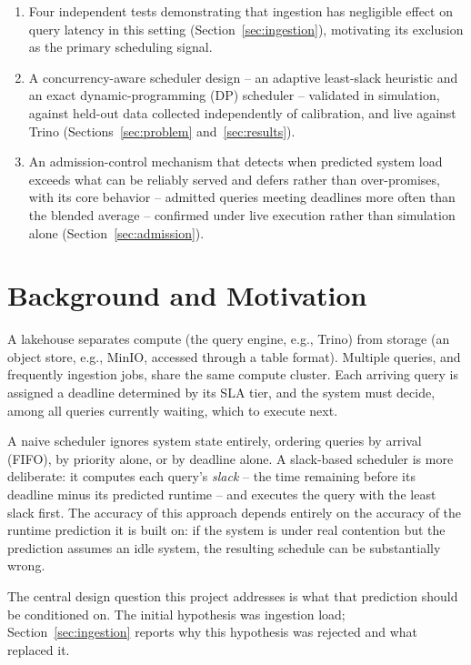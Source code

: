 \documentclass[conference]{IEEEtran}
\begin{document}
\begin{enumerate}
\item Four independent tests demonstrating that ingestion has negligible effect on query latency in this setting (Section~\ref{sec:ingestion}), motivating its exclusion as the primary scheduling signal.
\item A concurrency-aware scheduler design -- an adaptive least-slack heuristic and an exact dynamic-programming (DP) scheduler -- validated in simulation, against held-out data collected independently of calibration, and live against Trino (Sections~\ref{sec:problem} and~\ref{sec:results}).
\item An admission-control mechanism that detects when predicted system load exceeds what can be reliably served and defers rather than over-promises, with its core behavior -- admitted queries meeting deadlines more often than the blended average -- confirmed under live execution rather than simulation alone (Section~\ref{sec:admission}).
\end{enumerate}

\section{Background and Motivation}
\label{sec:background}

A lakehouse separates compute (the query engine, e.g., Trino) from storage (an object store, e.g., MinIO, accessed through a table format). Multiple queries, and frequently ingestion jobs, share the same compute cluster. Each arriving query is assigned a deadline determined by its SLA tier, and the system must decide, among all queries currently waiting, which to execute next.

A naive scheduler ignores system state entirely, ordering queries by arrival (FIFO), by priority alone, or by deadline alone. A slack-based scheduler is more deliberate: it computes each query's \emph{slack} -- the time remaining before its deadline minus its predicted runtime -- and executes the query with the least slack first. The accuracy of this approach depends entirely on the accuracy of the runtime prediction it is built on: if the system is under real contention but the prediction assumes an idle system, the resulting schedule can be substantially wrong.

The central design question this project addresses is what that prediction should be conditioned on. The initial hypothesis was ingestion load; Section~\ref{sec:ingestion} reports why this hypothesis was rejected and what replaced it.
\end{document}
